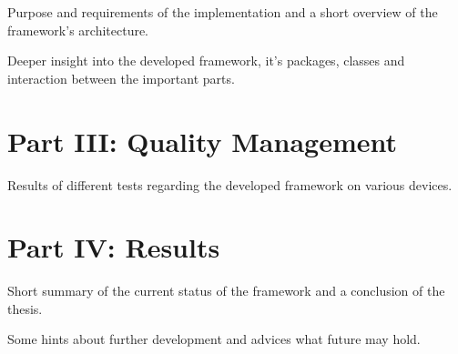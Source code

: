   \vspace{1mm}

\noindent  Purpose and requirements of the implementation and a short overview of the framework's architecture. \\

  \vspace{1mm}

\noindent  Deeper insight into the developed framework, it's packages, classes and interaction between the important parts. \\

\section*{Part III: Quality Management}

  \vspace{1mm}

\noindent  Results of different tests regarding the developed framework on various devices. \\

\newpage

\section*{Part IV: Results}

  \vspace{1mm}

\noindent  Short summary of the current status of the framework and a conclusion of the thesis. \\

  \vspace{1mm}

\noindent  Some hints about further development and advices what future may hold. \\
